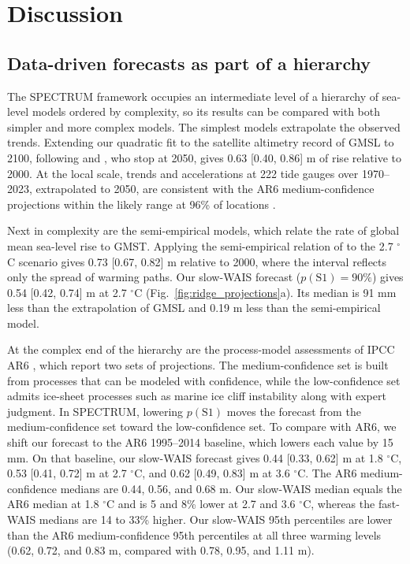 \documentclass[draft,linenumbers]{agujournal2025}
\begin{document}
\section{Discussion}

\subsection{Data-driven forecasts as part of a hierarchy}

The SPECTRUM framework occupies an intermediate level of a hierarchy of sea-level models ordered by complexity, so its results can be compared with both simpler and more complex models. The simplest models extrapolate the observed trends. Extending our quadratic fit to the satellite altimetry record of GMSL to 2100, following \citet{Nerem2022} and \citet{Hamlington2024}, who stop at 2050, gives 0.63 [0.40, 0.86] m of rise relative to 2000. At the local scale, trends and accelerations at 222 tide gauges over 1970--2023, extrapolated to 2050, are consistent with the AR6 medium-confidence projections within the likely range at 96\% of locations \citep{Wang2025GRL}.

Next in complexity are the semi-empirical models, which relate the rate of global mean sea-level rise to GMST. Applying the semi-empirical relation of \citet{Rahmstorf2007} to the 2.7 $^\circ$C scenario gives 0.73 [0.67, 0.82] m relative to 2000, where the interval reflects only the spread of warming paths. Our slow-WAIS forecast ($p(\mathrm{S1}) = 90\%$) gives 0.54 [0.42, 0.74] m at 2.7 $^\circ$C (Fig.~\ref{fig:ridge_projections}a). Its median is 91 mm less than the extrapolation of GMSL and 0.19 m less than the semi-empirical model.

At the complex end of the hierarchy are the process-model assessments of IPCC AR6 \citep{Fox-Kemper2021}, which report two sets of projections. The medium-confidence set is built from processes that can be modeled with confidence, while the low-confidence set admits ice-sheet processes such as marine ice cliff instability along with expert judgment. In SPECTRUM, lowering $p(\mathrm{S1})$ moves the forecast from the medium-confidence set toward the low-confidence set. To compare with AR6, we shift our forecast to the AR6 1995--2014 baseline, which lowers each value by 15 mm. On that baseline, our slow-WAIS forecast gives 0.44 [0.33, 0.62] m at 1.8 $^\circ$C, 0.53 [0.41, 0.72] m at 2.7 $^\circ$C, and 0.62 [0.49, 0.83] m at 3.6 $^\circ$C. The AR6 medium-confidence medians are 0.44, 0.56, and 0.68 m. Our slow-WAIS median equals the AR6 median at 1.8 $^\circ$C and is 5 and 8\% lower at 2.7 and 3.6 $^\circ$C, whereas the fast-WAIS medians are 14 to 33\% higher. Our slow-WAIS 95th percentiles are lower than the AR6 medium-confidence 95th percentiles at all three warming levels (0.62, 0.72, and 0.83 m, compared with 0.78, 0.95, and 1.11 m).
\end{document}
